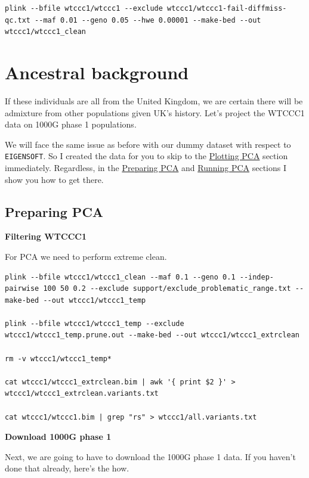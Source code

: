 \documentclass[
]{book}
\begin{document}
\begin{verbatim}
plink --bfile wtccc1/wtccc1 --exclude wtccc1/wtccc1-fail-diffmiss-qc.txt --maf 0.01 --geno 0.05 --hwe 0.00001 --make-bed --out wtccc1/wtccc1_clean
\end{verbatim}

\hypertarget{ancestral-background-1}{%
\section{Ancestral background}\label{ancestral-background-1}}

If these individuals are all from the United Kingdom, we are certain there will be admixture from other populations given UK's history. Let's project the WTCCC1 data on 1000G phase 1 populations.

We will face the same issue as before with our dummy dataset with respect to \texttt{EIGENSOFT}. So I created the data for you to skip to the \protect\hyperlink{plotting-pca}{Plotting PCA} section immediately. Regardless, in the \protect\hyperlink{preparing-pca}{Preparing PCA} and \protect\hyperlink{running-pca-1}{Running PCA} sections I show you how to get there.

\hypertarget{preparing-pca}{%
\subsection{Preparing PCA}\label{preparing-pca}}

\textbf{Filtering WTCCC1}

For PCA we need to perform extreme clean.

\begin{verbatim}
plink --bfile wtccc1/wtccc1_clean --maf 0.1 --geno 0.1 --indep-pairwise 100 50 0.2 --exclude support/exclude_problematic_range.txt --make-bed --out wtccc1/wtccc1_temp

plink --bfile wtccc1/wtccc1_temp --exclude wtccc1/wtccc1_temp.prune.out --make-bed --out wtccc1/wtccc1_extrclean

rm -v wtccc1/wtccc1_temp*

cat wtccc1/wtccc1_extrclean.bim | awk '{ print $2 }' > wtccc1/wtccc1_extrclean.variants.txt

cat wtccc1/wtccc1.bim | grep "rs" > wtccc1/all.variants.txt
\end{verbatim}

\textbf{Download 1000G phase 1}

Next, we are going to have to download the 1000G phase 1 data. If you haven't done that already, here's the how.
\end{document}
